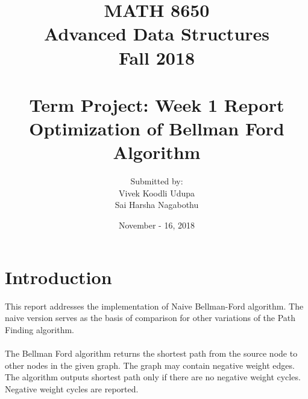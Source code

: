 \documentclass[12pt]{article}
\title{MATH 8650 \\ Advanced Data Structures \\ Fall 2018\\ \quad \\
	Term Project: Week 1 Report \\ Optimization of Bellman Ford Algorithm}
\author{Submitted by: 
\\ Vivek Koodli Udupa 
\\ Sai Harsha Nagabothu}
\date{November - 16, 2018 }
\begin{document}
\begin{mdframed}
\maketitle
\end{mdframed}

\section{Introduction}
This report addresses the implementation of Naive Bellman-Ford algorithm. The naive version serves as the basis of comparison for other variations of the Path Finding algorithm. \\
\\
The Bellman Ford algorithm returns the shortest path from the source node to other nodes in the given graph. The graph may contain negative weight edges. The algorithm outputs shortest path only if there are no negative weight cycles. Negative weight cycles are reported. \\
\end{document}
